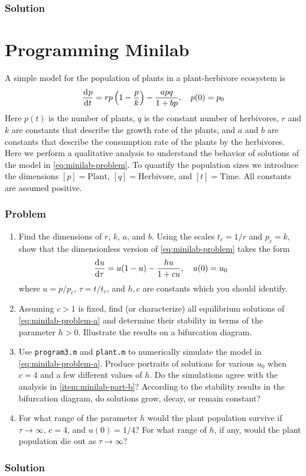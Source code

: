 \documentclass[12pt]{article}
\begin{document}
\subsubsection*{Solution}
\todo[]

\newpage
\section{Programming Minilab}
A simple model for the population of plants in a plant-herbivore ecosystem is
\begin{equation}
  \label{eq:minilab-problem}
  \frac{\mathrm{d}^{} {p}}{\mathrm{d}{t}^{}} = rp\left( 1-\frac{p}{k} \right) - \frac{apq}{1+bp}, \quad p(0)=p_0
\end{equation}
Here $p(t)$ is the number of plants, $q$ is the constant number of herbivores,
$r$ and $k$ are constants that describe the growth rate of the plants, and $a$
and $b$ are constants that describe the consumption rate of the plants by the
herbivores. Here we perform a qualitative analysis to understand the behavior of
solutions of the model in \cref{eq:minilab-problem}. To quantify the population
sizes we introduce the dimensions $[p] = \text{Plant}$, $[q] =
\text{Herbivore}$, and $[t] = \text{Time}$. All constants are assumed positive.

\subsubsection*{Problem}
\begin{enumerate}
\item Find the dimensions of $r$, $k$, $a$, and $b$. Using the scales $t_c =
  1/r$ and $p_c = k$, show that the dimensionless version of
  \cref{eq:minilab-problem} takes the form
  \begin{equation}
    \label{eq:minilab-problem-a}
    \frac{\mathrm{d}^{} {u}}{\mathrm{d}{\tau}^{}}=u(1-u)-\frac{hu}{1+cu},\quad u(0)=u_0
  \end{equation}
  where $u=p/p_c$, $\tau=t/t_c$, and $h,c$ are constants which you should
  identify.
\item Assuming $c>1$ is fixed, find (or characterize) all equilibrium solutions
  of \cref{eq:minilab-problem-a} and determine their stability in terms of the
  parameter $h>0$. Illustrate the results on a bifurcation diagram.
\label{item:minilab-part-b}
\item Use \verb|program3.m| and \verb|plant.m| to numerically simulate the model
  in \cref{eq:minilab-problem-a}. Produce portraits of solutions for various
  $u_0$ when $c=4$ and a few different values of $h$. Do the simulations agree
  with the analysis in \cref{item:minilab-part-b}? According to the stability
  results in the bifurcation diagram, do solutions grow, decay, or remain
  constant?
\item For what range of the parameter $h$ would the plant population survive if
  $\tau\rightarrow\infty$, $c=4$, and $u(0)=1/4$? For what range of $h$, if any,
  would the plant population die out as $\tau\rightarrow\infty$?
\end{enumerate}

\subsubsection*{Solution}
\todo[]
\end{document}
